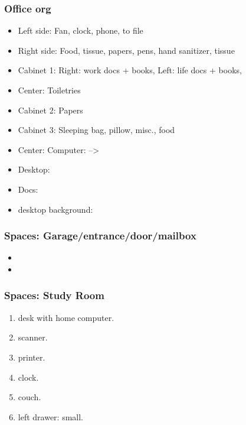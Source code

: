 \begin{frame}[label=office] 
\frametitle{Office org}
\begin{itemize}
\tiny \item \tiny Left side: Fan, clock, phone, to file 
\item \tiny Right side: Food, tissue, papers, pens, hand sanitizer, tissue
\item \tiny Cabinet 1: Right: work docs + books, Left: life docs + books,
\item \tiny Center: Toiletries
\item \tiny Cabinet 2: Papers
\item \tiny Cabinet 3: Sleeping bag, pillow, misc., food
\item \tiny Center: Computer: --> 
\item \tiny Desktop: 
\item \tiny Docs: 
\item \tiny desktop background:  
\end{itemize} 
\end{frame}

\begin{frame}[label=garage]
\frametitle{Spaces: Garage/entrance/door/mailbox}
\begin{itemize}
\small \item \small  
\item \small 
\end{itemize} 
\end{frame} 

\begin{frame}[label=study]
\frametitle{Spaces: Study Room}
\begin{enumerate} 
\small \item \small desk with home computer. 
\small \item \small scanner. 
\item \small printer. 
\item \small clock.
\item \small couch.
\item \small left drawer: small.
\end{enumerate} 
\end{frame}

